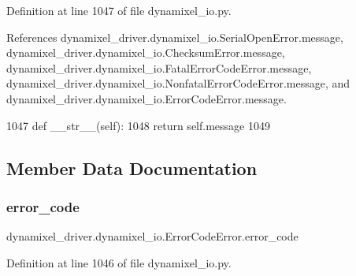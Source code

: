 Definition at line 1047 of file dynamixel\+\_\+io.\+py.



References dynamixel\+\_\+driver.\+dynamixel\+\_\+io.\+Serial\+Open\+Error.\+message, dynamixel\+\_\+driver.\+dynamixel\+\_\+io.\+Checksum\+Error.\+message, dynamixel\+\_\+driver.\+dynamixel\+\_\+io.\+Fatal\+Error\+Code\+Error.\+message, dynamixel\+\_\+driver.\+dynamixel\+\_\+io.\+Nonfatal\+Error\+Code\+Error.\+message, and dynamixel\+\_\+driver.\+dynamixel\+\_\+io.\+Error\+Code\+Error.\+message.


\begin{DoxyCode}
1047     \textcolor{keyword}{def }\_\_str\_\_(self):
1048         \textcolor{keywordflow}{return} self.message
1049 
\end{DoxyCode}


\subsection{Member Data Documentation}
\mbox{\label{classdynamixel__driver_1_1dynamixel__io_1_1_error_code_error_adcc9c0fc18f416577ac6bd63acd7640c}} 
\subsubsection{\texorpdfstring{error\+\_\+code}{error\_code}}
{\footnotesize\ttfamily dynamixel\+\_\+driver.\+dynamixel\+\_\+io.\+Error\+Code\+Error.\+error\+\_\+code}



Definition at line 1046 of file dynamixel\+\_\+io.\+py.

\mbox{\label{classdynamixel__driver_1_1dynamixel__io_1_1_error_code_error_a1031c34e3bc89a21b256b110dade5cbe}} 
